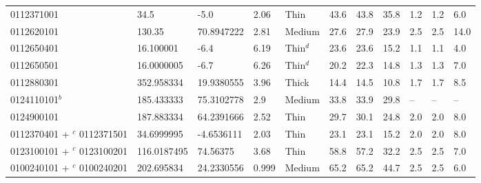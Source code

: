 \documentclass[fleqn,usenatbib]{mnras}
\begin{document}
\begin{table*}
\begin{tabular}{lllllllllll}
                        0112371001 &         34.5 &         -5.0 &                  2.06 &      Thin &      43.6 &       43.8 &        35.8 &              1.2 &              1.2 &              6.0 \\
                        0112620101 &       130.35 &   70.8947222 &                  2.81 &    Medium &      27.6 &       27.9 &        23.9 &              2.5 &              2.5 &             14.0 \\
                        0112650401 &    16.100001 &         -6.4 &                  6.19 &  Thin$^d$ &      23.6 &       23.6 &        15.2 &              1.1 &              1.1 &              4.0 \\
                        0112650501 &   16.0000005 &         -6.7 &                  6.26 &  Thin$^d$ &      20.2 &       22.3 &        14.8 &              1.3 &              1.3 &              7.0 \\
                        0112880301 &   352.958334 &   19.9380555 &                  3.96 &     Thick &      14.4 &       14.5 &        10.8 &              1.7 &              1.7 &              8.5 \\
                    0124110101$^b$ &   185.433333 &   75.3102778 &                   2.9 &    Medium &      33.8 &       33.9 &        29.8 &               -- &               -- &               -- \\
                        0124900101 &   187.883334 &   64.2391666 &                  2.52 &      Thin &      29.7 &       30.1 &        24.8 &              2.0 &              2.0 &              8.0 \\
         \parbox{2cm}{\vspace{1.5mm} 0112370401 + $^c$ \\ 0112371501 \vspace{1.5mm}} &   34.6999995 &   -4.6536111 &                  2.03 &      Thin &      23.1 &       23.1 &        15.2 &              2.0 &              2.0 &              8.0 \\
         \parbox{2cm}{\vspace{1.5mm} 0123100101 + $^c$ \\ 0123100201 \vspace{1.5mm}} &  116.0187495 &     74.56375 &                  3.68 &      Thin &      58.8 &       57.2 &        32.2 &              2.5 &              2.5 &              7.0 \\
         \parbox{2cm}{\vspace{1.5mm} 0100240101 + $^c$ \\ 0100240201 \vspace{1.5mm}} &   202.695834 &   24.2330556 &                 0.999 &    Medium &      65.2 &       65.2 &        44.7 &              2.5 &              2.5 &              6.0 \\

\end{tabular}
\end{table*}
\end{document}
